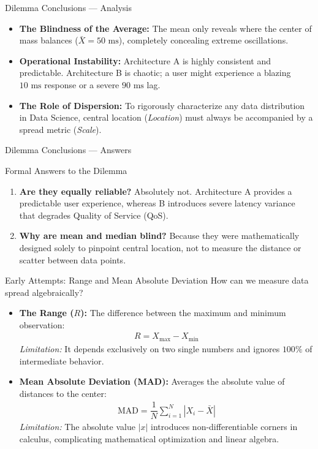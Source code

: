 \documentclass[aspectratio=169,xcolor={dvipsnames,table}]{beamer}
\begin{document}
\begin{frame}{Dilemma Conclusions — Analysis}
  \begin{itemize}
    \item \textbf{The Blindness of the Average:} The mean only reveals where the center of mass balances ($\bar{X} = 50 \text{ ms}$), completely concealing extreme oscillations. \pause
    \item \textbf{Operational Instability:} Architecture A is highly consistent and predictable. Architecture B is chaotic; a user might experience a blazing $10 \text{ ms}$ response or a severe $90 \text{ ms}$ lag. \pause
    \item \textbf{The Role of Dispersion:} To rigorously characterize any data distribution in Data Science, central location (\emph{Location}) must always be accompanied by a spread metric (\emph{Scale}).
  \end{itemize}
\end{frame}

\begin{frame}{Dilemma Conclusions — Answers}
  \begin{block}{Formal Answers to the Dilemma}
    \begin{enumerate}
      \item \textbf{Are they equally reliable?} Absolutely not. Architecture A provides a predictable user experience, whereas B introduces severe latency variance that degrades Quality of Service (QoS). \pause
      \item \textbf{Why are mean and median blind?} Because they were mathematically designed solely to pinpoint central location, not to measure the distance or scatter between data points.
    \end{enumerate}
  \end{block}
\end{frame}

\begin{frame}{Early Attempts: Range and Mean Absolute Deviation}
  How can we measure data spread algebraically? \pause
  \begin{itemize}
    \item \textbf{The Range ($R$):} The difference between the maximum and minimum observation:
      \begin{align}
        R = X_{\max} - X_{\min}
      \end{align}
      \small \emph{Limitation:} It depends exclusively on two single numbers and ignores $100\%$ of intermediate behavior. \pause
    \item \textbf{Mean Absolute Deviation (MAD):} Averages the absolute value of distances to the center:
      \begin{align}
        \text{MAD} = \dfrac{1}{N} \sum_{i=1}^{N} |X_i - \bar{X}|
      \end{align}
      \small \emph{Limitation:} The absolute value $|x|$ introduces non-differentiable corners in calculus, complicating mathematical optimization and linear algebra.
  \end{itemize}
\end{frame}
\end{document}
